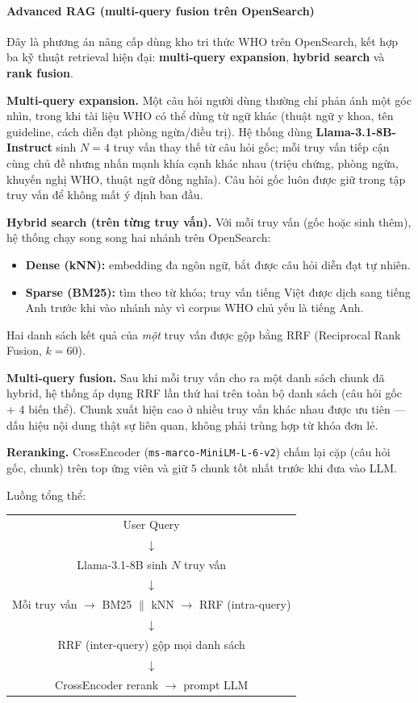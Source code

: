 \paragraph{Advanced RAG (multi-query fusion trên OpenSearch)}

Đây là phương án nâng cấp dùng kho tri thức WHO trên OpenSearch, kết hợp ba kỹ thuật retrieval hiện đại: \textbf{multi-query expansion}, \textbf{hybrid search} và \textbf{rank fusion}.

\textbf{Multi-query expansion.} Một câu hỏi người dùng thường chỉ phản ánh một góc nhìn, trong khi tài liệu WHO có thể dùng từ ngữ khác (thuật ngữ y khoa, tên guideline, cách diễn đạt phòng ngừa/điều trị). Hệ thống dùng \textbf{Llama-3.1-8B-Instruct} sinh $N = 4$ truy vấn thay thế từ câu hỏi gốc; mỗi truy vấn tiếp cận cùng chủ đề nhưng nhấn mạnh khía cạnh khác nhau (triệu chứng, phòng ngừa, khuyến nghị WHO, thuật ngữ đồng nghĩa). Câu hỏi gốc luôn được giữ trong tập truy vấn để không mất ý định ban đầu.

\textbf{Hybrid search (trên từng truy vấn).} Với mỗi truy vấn (gốc hoặc sinh thêm), hệ thống chạy song song hai nhánh trên OpenSearch:
\begin{itemize}
    \item \textbf{Dense (kNN):} embedding đa ngôn ngữ, bắt được câu hỏi diễn đạt tự nhiên.
    \item \textbf{Sparse (BM25):} tìm theo từ khóa; truy vấn tiếng Việt được dịch sang tiếng Anh trước khi vào nhánh này vì corpus WHO chủ yếu là tiếng Anh.
\end{itemize}
Hai danh sách kết quả của \emph{một} truy vấn được gộp bằng RRF (Reciprocal Rank Fusion, $k = 60$).

\textbf{Multi-query fusion.} Sau khi mỗi truy vấn cho ra một danh sách chunk đã hybrid, hệ thống áp dụng RRF lần thứ hai trên toàn bộ danh sách (câu hỏi gốc + 4 biến thể). Chunk xuất hiện cao ở nhiều truy vấn khác nhau được ưu tiên --- dấu hiệu nội dung thật sự liên quan, không phải trùng hợp từ khóa đơn lẻ.

\textbf{Reranking.} CrossEncoder (\texttt{ms-marco-MiniLM-L-6-v2}) chấm lại cặp (câu hỏi gốc, chunk) trên top ứng viên và giữ $5$ chunk tốt nhất trước khi đưa vào LLM.

Luồng tổng thể:
\begin{center}
\begin{tabular}{c}
User Query \\
$\downarrow$ \\
Llama-3.1-8B sinh $N$ truy vấn \\
$\downarrow$ \\
Mỗi truy vấn $\rightarrow$ BM25 $\parallel$ kNN $\rightarrow$ RRF (intra-query) \\
$\downarrow$ \\
RRF (inter-query) gộp mọi danh sách \\
$\downarrow$ \\
CrossEncoder rerank $\rightarrow$ prompt LLM \\
\end{tabular}
\end{center}

